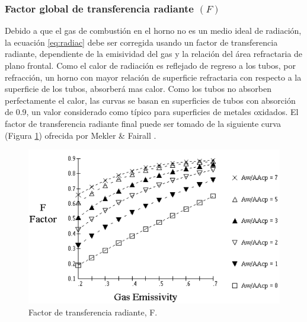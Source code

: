 \subsubsection{Factor global de transferencia radiante $(F)$}
\par Debido a que el gas de combustión en el horno no es un medio ideal de radiación, la ecuación \ref{eq:radiac} debe ser corregida usando un factor de transferencia radiante, dependiente de la emisividad del gas y la relación del área refractaria de plano frontal. Como el calor de radiación es reflejado de regreso a los tubos, por refracción, un horno con mayor relación de superficie refractaria con respecto a la superficie de los tubos, absorberá mas calor. Como los tubos no absorben perfectamente el calor, las curvas se basan en superficies de tubos con absorción de 0.9, un valor considerado como típico para superficies de metales oxidados. El factor de transferencia radiante final puede ser tomado de la siguiente curva (Figura \ref{fig:f}) ofrecida por Mekler \& Fairall \cite{bib:mekler}.
\begin{figure}[H]
\begin{center}
\includegraphics[scale=0.45]{images/f}
\caption[Factor de transferencia radiante, F]{Factor de transferencia radiante, F.\cite{bib:mekler}}
\label{fig:f}
\end{center}
\end{figure}

